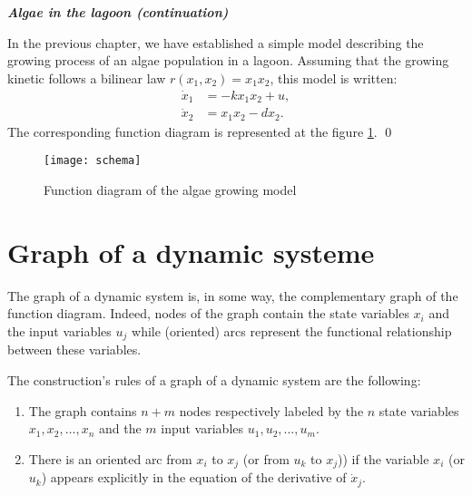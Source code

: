 \begin{exemple}{\bf \em Algae in the lagoon (continuation)}

In the previous chapter, we have established a simple model describing the growing process of an algae population in a lagoon. Assuming that the growing kinetic follows a bilinear law  $r(x_1,x_2) = x_1x_2$, this model is written:
\begin{equation*} \begin{split}
\dot x_1 &= -kx_1x_2 + u, \\
\dot x_2 &= x_1x_2 - dx_2.
\end{split} \end{equation*}
The corresponding function diagram is represented at the figure 
\ref{Fig:schema}. \qed
\begin{figure}[htbp] 
   \centering
   \texttt{[image: schema]} 
   \caption{Function diagram of the algae growing model}
   \label{Fig:schema}
\end{figure}
\end{exemple}

\section{Graph of a dynamic systeme}

The graph of a dynamic system is, in some way, the complementary graph of the function diagram. Indeed, nodes of the graph contain the state variables $x_i$ and the input variables $u_j$ while (oriented) arcs represent the functional relationship between these variables.
 
The construction’s rules of a graph of a dynamic system are the following:

\begin{enumerate}
\item The graph contains $n + m$ nodes respectively labeled by the $n$ state variables  $x_1, x_2, \dots , x_n$ and the $m$ input variables  $u_1,u_2, \dots , u_m$.
\item There is an oriented arc from $x_i$ to $x_j$ (or from $u_k$ to $x_j$)) if the variable $x_i$ (or $u_k$) appears explicitly in the equation of the derivative of  $\dot x_j$.
\end{enumerate}
\vv

